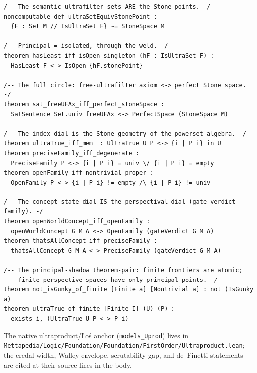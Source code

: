 \documentclass[]{article}
\theoremstyle{definition}
\theoremstyle{remark}
\newcommand{\code}[1]{\texttt{#1}}
\newcommand{\lpath}[1]{{\ttfamily\nolinkurl{#1}}}
\begin{document}
\begin{lstlisting}
/-- The semantic ultrafilter-sets ARE the Stone points. -/
noncomputable def ultraSetEquivStonePoint :
  {F : Set M // IsUltraSet F} ~= StoneSpace M

/-- Principal = isolated, through the weld. -/
theorem hasLeast_iff_isOpen_singleton (hF : IsUltraSet F) :
  HasLeast F <-> IsOpen {hF.stonePoint}

/-- The full circle: free-ultrafilter axiom <-> perfect Stone space. -/
theorem sat_freeUFAx_iff_perfect_stoneSpace :
  SatSentence Set.univ freeUFAx <-> PerfectSpace (StoneSpace M)

/-- The index dial is the Stone geometry of the powerset algebra. -/
theorem ultraTrue_iff_mem  : UltraTrue U P <-> {i | P i} in U
theorem preciseFamily_iff_degenerate :
  PreciseFamily P <-> {i | P i} = univ \/ {i | P i} = empty
theorem openFamily_iff_nontrivial_proper :
  OpenFamily P <-> {i | P i} != empty /\ {i | P i} != univ

/-- The concept-state dial IS the perspectival dial (gate-verdict family). -/
theorem openWorldConcept_iff_openFamily :
  openWorldConcept G M A <-> OpenFamily (gateVerdict G M A)
theorem thatsAllConcept_iff_preciseFamily :
  thatsAllConcept G M A <-> PreciseFamily (gateVerdict G M A)

/-- The principal-shadow theorem-pair: finite frontiers are atomic;
    finite perspective-spaces have only principal points. -/
theorem not_isGunky_of_finite [Finite a] [Nontrivial a] : not (IsGunky a)
theorem ultraTrue_of_finite [Finite I] (U) (P) :
  exists i, (UltraTrue U P <-> P i)
\end{lstlisting}

\noindent The native ultraproduct/{\L}o\'s anchor (\code{models\_Uprod}) lives in
\lpath{Mettapedia/Logic/Foundation/Foundation/FirstOrder/Ultraproduct.lean}; the
credal-width, Walley-envelope, scrutability-gap, and de~Finetti statements are cited at
their source lines in the body.
\end{document}
